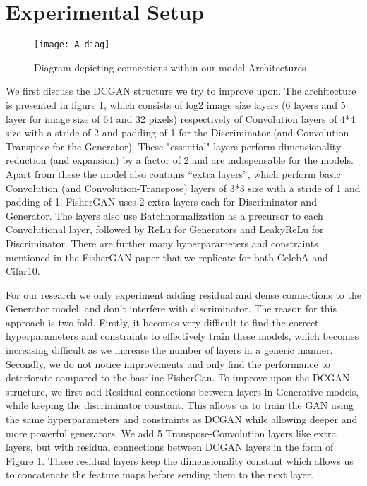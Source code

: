 \documentclass{article}
\begin{document}
\section{Experimental Setup}
\label{sec:ES}

\begin{figure}[h]
\caption{Diagram depicting connections within our model Architectures }
\texttt{[image: A\_diag]}
\end{figure}

We first discuss the DCGAN structure we try to improve upon. The architecture is presented in figure 1, which consists of log2 image size layers (6 layers and 5 layer for image size of 64 and 32 pixels) respectively of Convolution layers of 4*4 size with a stride of 2 and padding of 1 for the Discriminator (and Convolution-Transpose for the Generator). These "essential" layers perform dimensionality reduction (and expansion) by a factor of 2 and are indispensable for the models. Apart from these the model also contains “extra layers”, which perform basic Convolution (and Convolution-Transpose) layers of 3*3 size with a stride of 1 and padding of 1. FisherGAN uses 2 extra layers each for Discriminator and Generator. The layers also use Batchnormalization as a precursor to each Convolutional layer, followed by ReLu for Generators and LeakyReLu for Discriminator. There are further many hyperparameters and constraints mentioned in the FisherGAN paper that we replicate for both CelebA and Cifar10.

For our research we only experiment adding residual and dense connections to the Generator model, and don’t interfere with discriminator. The reason for this approach is two fold. Firstly, it becomes very difficult to find the correct hyperparameters and constraints to effectively train these models, which becomes increasing difficult as we increase the number of layers in a generic manner. Secondly, we do not notice improvements and only find the performance to deteriorate compared to the baseline FisherGan. To improve upon the DCGAN structure, we first add Residual connections between layers in Generative models, while keeping the discriminator constant. This allows us to train the GAN using the same hyperparameters and constraints as DCGAN while allowing deeper and more powerful generators. We add 5 Transpose-Convolution layers like extra layers, but with residual connections between DCGAN layers in the form of Figure 1. These residual layers keep the dimensionality constant which allows us to concatenate the feature maps before sending them to the next layer.
\end{document}
